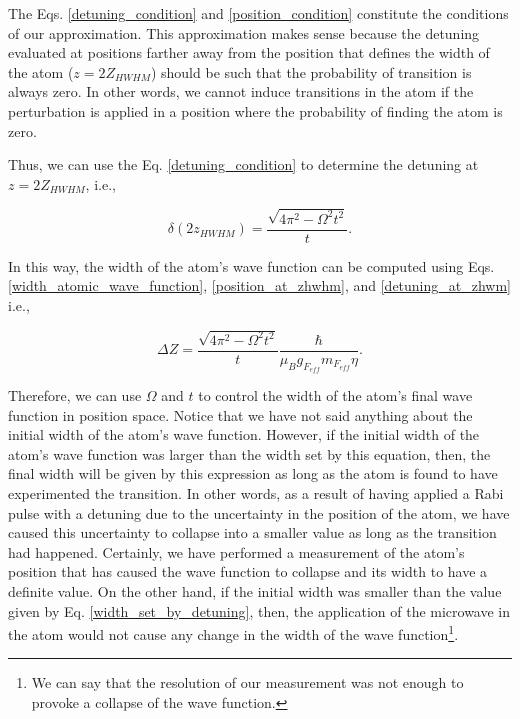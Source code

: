 \documentclass{article}
\begin{document}
The Eqs. \ref{detuning_condition} and \ref{position_condition} constitute the conditions of our approximation. This approximation makes sense because the detuning evaluated at positions farther away from the position that defines the width of the atom ($z=2Z_{HWHM}$) should be such that the probability of transition is always zero. In other words, we cannot induce transitions in the atom if the perturbation is applied in a position where the probability of finding the atom is zero.

Thus, we can use the Eq. \ref{detuning_condition} to determine the detuning at $z=2Z_{HWHM}$, i.e.,

\begin{equation}\label{detuning_at_zhwm}
\delta (2z_{HWHM}) = \frac{\sqrt{4 \pi^{2} - \Omega^{2} t^{2}}}{t}.
\end{equation}

In this way, the width of the atom's wave function can be computed using Eqs. \ref{width_atomic_wave_function}, \ref{position_at_zhwhm}, and \ref{detuning_at_zhwm} i.e.,

\begin{equation}\label{width_set_by_detuning}
\Delta Z = \frac{\sqrt{4 \pi^{2} - \Omega^{2} t^{2}}}{t} \frac{\hbar}{\mu_{B} g_{F_{eff}} m_{F_{eff}} \eta}.
\end{equation}

Therefore, we can use $\Omega$ and $t$ to control the width of the atom's final wave function in position space. Notice that we have not said anything about the initial width of the atom's wave function. However, if the initial width of the atom's wave function was larger than the width set by this equation, then, the final width will be given by this expression as long as the atom is found to have experimented the transition. In other words, as a result of having applied a Rabi pulse with a detuning due to the uncertainty in the position of the atom, we have caused this uncertainty to collapse into a smaller value as long as the transition had happened. Certainly, we have performed a measurement of the atom's position that has caused the wave function to collapse and its width to have a definite value. On the other hand, if the initial width was smaller than the value given by Eq. \ref{width_set_by_detuning}, then, the application of the microwave in the atom would not cause any change in the width of the wave function\footnote{We can say that the resolution of our measurement was not enough to provoke a collapse of the wave function.}. 
\end{document}
